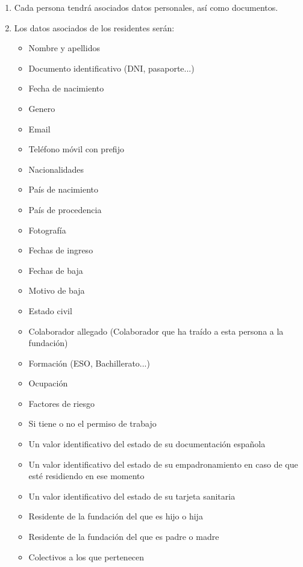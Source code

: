 \begin{enumerate}[start=6,label={RNF-\arabic*.}]

    \item Cada persona tendrá asociados datos personales, así como documentos.
    \item Los datos asociados de los residentes serán:
        \begin{itemize}
            \item Nombre y apellidos
            \item Documento identificativo (DNI, pasaporte...)
            \item Fecha de nacimiento
            \item Genero
            \item Email
            \item Teléfono móvil con prefijo
            \item Nacionalidades
            \item País de nacimiento
            \item País de procedencia
            \item Fotografía
            \item Fechas de ingreso
            \item Fechas de baja
            \item Motivo de baja
            \item Estado civil
            \item Colaborador allegado (Colaborador que ha traído a esta persona a la fundación)
            \item Formación (ESO, Bachillerato...)
            \item Ocupación
            \item Factores de riesgo
            \item Si tiene o no el permiso de trabajo
            \item Un valor identificativo del estado de su documentación española
            \item Un valor identificativo del estado de su empadronamiento en caso de que esté residiendo en ese momento
            \item Un valor identificativo del estado de su tarjeta sanitaria
            \item Residente de la fundación del que es hijo o hija
            \item Residente de la fundación del que es padre o madre
            \item Colectivos a los que pertenecen

\end{itemize}
\end{enumerate}
